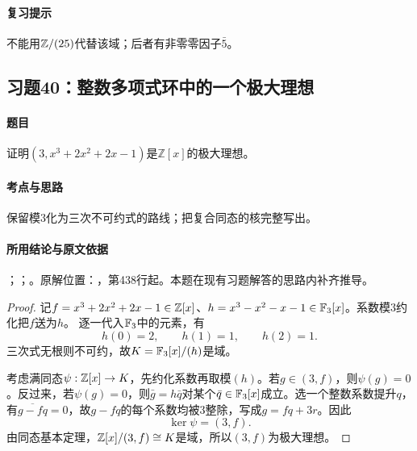 \paragraph{复习提示}

不能用$\mathbb Z/(25)$代替该域；后者有非零零因子$\bar5$。



\subsection{习题40：整数多项式环中的一个极大理想}

\label{ex:3:40}

\paragraph{题目}

证明$(3,x^3+2x^2+2x-1)$是$\mathbb Z[x]$的极大理想。

\paragraph{考点与思路}

保留模$3$化为三次不可约式的路线；把复合同态的核完整写出。

\paragraph{所用结论与原文依据}

；；。原解位置：，第438行起。本题在现有习题解答的思路内补齐推导。


\begin{proof}

记$f=x^3+2x^2+2x-1\in\mathbb Z[x]$、$h=x^3-x^2-x-1\in\mathbb F_3[x]$。系数模$3$约化把$f$送为$h$。
逐一代入$\mathbb F_3$中的元素，有
\[
h(0)=2,\qquad h(1)=1,\qquad h(2)=1.
\]
三次式无根则不可约，故$K=\mathbb F_3[x]/(h)$是域。

考虑满同态$\psi:\mathbb Z[x]\to K$，先约化系数再取模$(h)$。若$g\in(3,f)$，则$\psi(g)=0$。反过来，若$\psi(g)=0$，则$\bar g=h\bar q$对某个$\bar q\in\mathbb F_3[x]$成立。选一个整数系数提升$q$，有$\overline{g-fq}=0$，故$g-fq$的每个系数均被$3$整除，写成$g=fq+3r$。因此
\[
\ker\psi=(3,f).
\]
由同态基本定理，$\mathbb Z[x]/(3,f)\cong K$是域，所以$(3,f)$为极大理想。

\end{proof}

